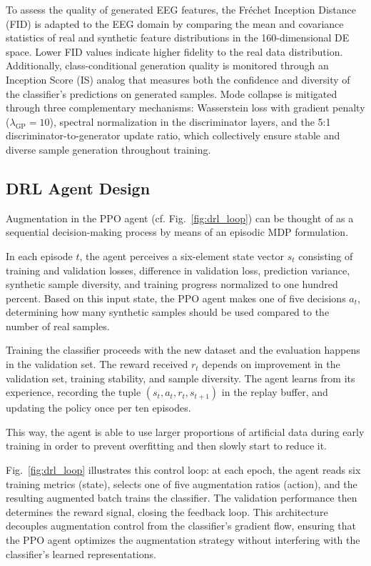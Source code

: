 \documentclass[conference]{IEEEtran}
\begin{document}
To assess the quality of generated EEG features, the Fr\'{e}chet Inception Distance (FID) is adapted to the EEG domain by comparing the mean and covariance statistics of real and synthetic feature distributions in the 160-dimensional DE space. Lower FID values indicate higher fidelity to the real data distribution. Additionally, class-conditional generation quality is monitored through an Inception Score (IS) analog that measures both the confidence and diversity of the classifier's predictions on generated samples. Mode collapse is mitigated through three complementary mechanisms: Wasserstein loss with gradient penalty ($\lambda_{\text{GP}} = 10$), spectral normalization in the discriminator layers, and the 5:1 discriminator-to-generator update ratio, which collectively ensure stable and diverse sample generation throughout training.

\subsection{DRL Agent Design}
Augmentation in the PPO agent (cf. Fig.~\ref{fig:drl_loop}) can be thought of as a sequential decision-making process by means of an episodic MDP formulation.

In each episode $t$, the agent perceives a six-element state vector $s_t$ consisting of training and validation losses, difference in validation loss, prediction variance, synthetic sample diversity, and training progress normalized to one hundred percent. Based on this input state, the PPO agent makes one of five decisions $a_t$, determining how many synthetic samples should be used compared to the number of real samples.

Training the classifier proceeds with the new dataset and the evaluation happens in the validation set. The reward received $r_t$ depends on improvement in the validation set, training stability, and sample diversity. The agent learns from its experience, recording the tuple $(s_t, a_t, r_t, s_{t+1})$ in the replay buffer, and updating the policy once per ten episodes.

This way, the agent is able to use larger proportions of artificial data during early training in order to prevent overfitting and then slowly start to reduce it.

Fig.~\ref{fig:drl_loop} illustrates this control loop: at each epoch, the agent reads six training metrics (state), selects one of five augmentation ratios (action), and the resulting augmented batch trains the classifier. The validation performance then determines the reward signal, closing the feedback loop. This architecture decouples augmentation control from the classifier's gradient flow, ensuring that the PPO agent optimizes the augmentation strategy without interfering with the classifier's learned representations.
\end{document}

